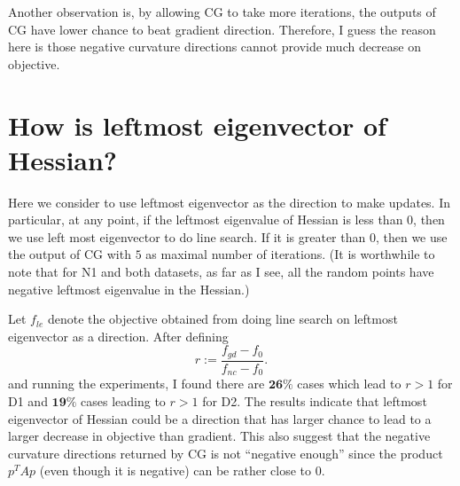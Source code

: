 \documentclass[12pt]{article}
\begin{document}
Another observation is, by allowing CG to take more iterations, the outputs of CG have lower chance to beat gradient direction. Therefore, I guess the reason here is those negative curvature directions cannot provide much decrease on objective.


\section{How is leftmost eigenvector of Hessian?}

Here we consider to use leftmost eigenvector as the direction to make updates. In particular, at any point, if the leftmost eigenvalue of Hessian is less than $0$, then we use left most eigenvector to do line search. If it is greater than $0$, then we use the output of CG with $5$ as maximal number of iterations. (It is worthwhile to note that for N1 and both datasets, as far as I see, all the random points have negative leftmost eigenvalue in the Hessian.)

Let $f_{le}$ denote the objective obtained from doing line search on leftmost eigenvector as a direction. After defining
$$ r:=\frac{f_{gd} - f_0}{f_{nc} - f_0 }.$$
and running the experiments, I found there are $\mathbf{26\%}$ cases which lead to $r>1$ for D1 and $\mathbf{19\%}$ cases leading to $r>1$ for D2. The results indicate that leftmost eigenvector of Hessian could be a direction that has larger chance to lead to a larger decrease in objective than gradient. This also suggest that the negative curvature directions returned by CG is not ``negative enough'' since the product $p^TA p$ (even though it is negative) can be rather close to $0$.
\end{document}
